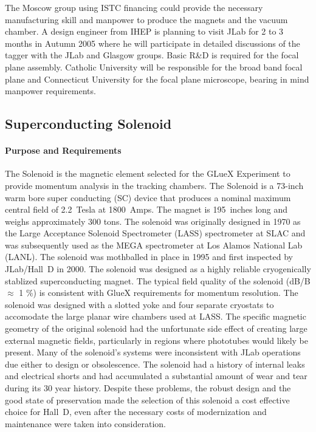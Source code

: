\documentclass[11pt]{article}
\begin{document}
The Moscow group using ISTC financing could provide the necessary 
manufacturing skill and manpower to produce the magnets and the 
vacuum chamber.  A design engineer from IHEP is planning to visit 
JLab for 2 to 3 months in Autumn 2005 where he will participate in 
detailed discussions of the tagger with the JLab and Glasgow groups. 
Basic R\&D is required for the focal plane assembly. Catholic University 
will be responsible for the broad band focal plane and Connecticut 
University for the focal plane microscope, bearing in mind manpower requirements.

\subsection{Superconducting Solenoid}

\paragraph{Purpose and Requirements}

The Solenoid is the magnetic element selected for the GLueX Experiment to
provide momentum analysis in the tracking chambers. The Solenoid
is a 73-inch warm bore super conducting (SC) device that produces
a nominal maximum central field of 2.2~Tesla at 1800~Amps. The magnet is
195~inches long and weighs  approximately 300 tons. The solenoid was originally
 designed in 1970 as the Large Acceptance Solenoid Spectrometer
 (LASS) spectrometer at
SLAC and was subsequently used as the MEGA spectrometer at 
Los Alamos National Lab (LANL). The
solenoid was mothballed in place
in 1995 and first inspected by JLab/Hall~D in 2000. The solenoid was
designed as a highly reliable cryogenically stablized superconducting magnet.
The typical field quality of the solenoid (dB/B $\approx$ 1 \%) is consistent with GlueX
requirements for momentum resolution. The solenoid was
designed with a slotted yoke and four separate cryostats to accomodate 
the large planar wire chambers used at LASS.
The specific magnetic geometry of the original solenoid had the unfortunate 
side effect of
creating large external magnetic fields, particularly in regions where
phototubes would likely be present. Many of the solenoid's systems were
inconsistent with JLab operations due either to design or obsolescence.
The solenoid had a history
of internal leaks and electrical shorts and had accumulated a substantial 
amount of wear and tear during its 30 year history.
Despite these problems, the robust design and the good state of
preservation made the selection of this solenoid a cost effective
choice for Hall~D, even after the necessary costs of modernization and
maintenance were taken into consideration.
\end{document}
